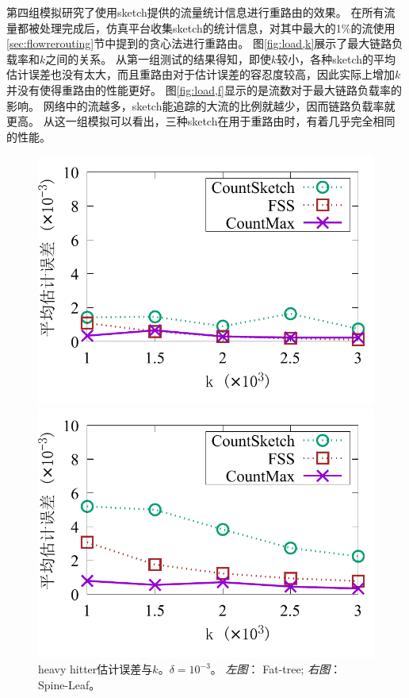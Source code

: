 第四组模拟研究了使用sketch提供的流量统计信息进行重路由的效果。
在所有流量都被处理完成后，仿真平台收集sketch的统计信息，对其中最大的1\%的流使用\ref{sec:flowrerouting}节中提到的贪心法进行重路由。
图\ref{fig:load,k}展示了最大链路负载率和$k$之间的关系。
从第一组测试的结果得知，即使$k$较小，各种sketch的平均估计误差也没有太大，而且重路由对于估计误差的容忍度较高，因此实际上增加$k$并没有使得重路由的性能更好。
图\ref{fig:load,f}显示的是流数对于最大链路负载率的影响。
网络中的流越多，sketch能追踪的大流的比例就越少，因而链路负载率就更高。
从这一组模拟可以看出，三种sketch在用于重路由时，有着几乎完全相同的性能。

\begin{figure}[ht]
	\centering
	\begin{minipage}[t]{0.49\linewidth}
		\centering
		\includegraphics[width=\linewidth]{fig/ft_k_hh_1000.pdf}
	\end{minipage}\vspace{-0.6em}%
	\begin{minipage}[t]{0.49\linewidth}
		\centering
		\includegraphics[width=\linewidth]{fig/hy_k_hh_1000.pdf}
	\end{minipage}\vspace{-0.6em}%
	\caption{\textnormal{heavy hitter估计误差与$k$。$\delta=10^{-3}$。 \textit{左图}： Fat-tree; \textit{右图}： Spine-Leaf。}}
	\label{fig:hh,k,1000}
\end{figure}

